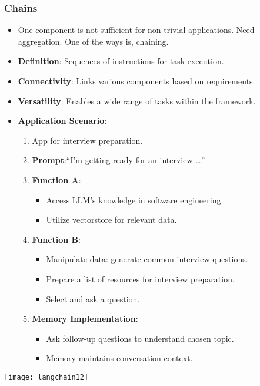 \begin{frame}[fragile]\frametitle{Chains}

      \begin{itemize}
	  \item One component is not sufficient for non-trivial applications. Need aggregation. One of the ways is, chaining.
        \item \textbf{Definition}: Sequences of instructions for task execution.
        \item \textbf{Connectivity}: Links various components based on requirements.
        \item \textbf{Versatility}: Enables a wide range of tasks within the framework.
        \item \textbf{Application Scenario}:
          \begin{enumerate}
            \item App for interview preparation.
            \item \textbf{Prompt}:``I'm getting ready for an interview \ldots ''

            \item \textbf{Function A}:
              \begin{itemize}
                \item Access LLM's knowledge in software engineering.
                \item Utilize vectorstore for relevant data.
              \end{itemize}
            \item \textbf{Function B}:
              \begin{itemize}
                \item Manipulate data: generate common interview questions.
                \item Prepare a list of resources for interview preparation.
                \item Select and ask a question.
              \end{itemize}
            \item \textbf{Memory Implementation}:
              \begin{itemize}
                \item Ask follow-up questions to understand chosen topic.
                \item Memory maintains conversation context.
              \end{itemize}
          \end{enumerate}
      \end{itemize}
			\begin{center}
			\texttt{[image: langchain12]}
			\end{center}	  



\end{frame}
